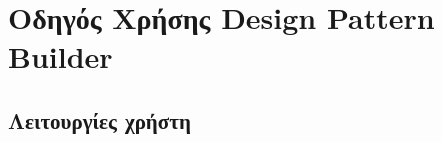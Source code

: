 \chapter{Οδηγός Χρήσης Design Pattern Builder}
\label{ch:manual}


\section{Λειτουργίες χρήστη}
\label{sec:manual}
